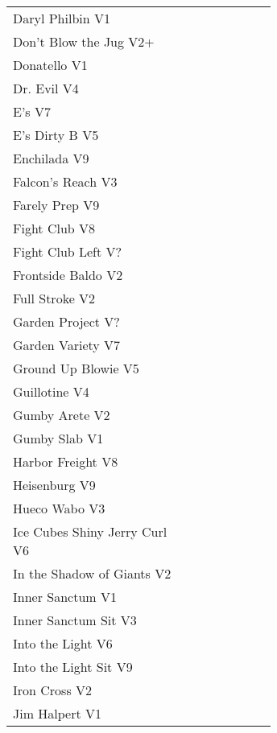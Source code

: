 \begin{center}
\begin{supertabular}{p{0.65\linewidth}r}
Daryl Philbin V1 & \pageref{rt:Daryl Philbin} \\
Don't Blow the Jug V2+ & \pageref{rt:Don't Blow the Jug} \\
Donatello V1 & \pageref{rt:Donatello} \\
Dr. Evil V4 & \pageref{rt:Dr. Evil} \\
E's V7 & \pageref{rt:E's} \\
E's Dirty B V5 & \pageref{rt:E's Dirty B} \\
Enchilada V9 & \pageref{rt:Enchilada} \\
Falcon's Reach V3 & \pageref{rt:Falcon's Reach} \\
Farely Prep V9 & \pageref{rt:Farely Prep} \\
Fight Club V8 & \pageref{rt:Fight Club} \\
Fight Club Left V? & \pageref{rt:Fight Club Left} \\
Frontside Baldo V2 & \pageref{rt:Frontside Baldo} \\
Full Stroke V2 & \pageref{rt:Full Stroke} \\
Garden Project V? & \pageref{rt:Garden Project} \\
Garden Variety V7 & \pageref{rt:Garden Variety} \\
Ground Up Blowie V5 & \pageref{rt:Ground Up Blowie} \\
Guillotine V4 & \pageref{rt:Guillotine} \\
Gumby Arete V2 & \pageref{rt:Gumby Arete} \\
Gumby Slab V1 & \pageref{rt:Gumby Slab} \\
Harbor Freight V8 & \pageref{vr:Harbor Freight} \\
Heisenburg V9 & \pageref{rt:Heisenburg} \\
Hueco Wabo V3 & \pageref{rt:Hueco Wabo} \\
Ice Cubes Shiny Jerry Curl V6 & \pageref{rt:Ice Cubes Shiny Jerry Curl} \\
In the Shadow of Giants V2 & \pageref{rt:In the Shadow of Giants} \\
Inner Sanctum V1 & \pageref{rt:Inner Sanctum} \\
Inner Sanctum Sit V3 & \pageref{vr:Inner Sanctum Sit} \\
Into the Light V6 & \pageref{rt:Into the Light} \\
Into the Light Sit V9 & \pageref{vr:Into the Light Sit} \\
Iron Cross V2 & \pageref{vr:Iron Cross} \\
Jim Halpert V1 & \pageref{rt:Jim Halpert} \\

\end{supertabular}
\end{center}

